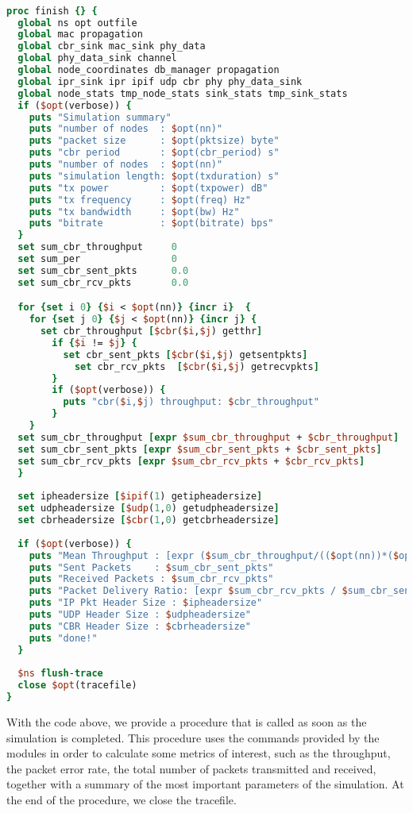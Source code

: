 \documentclass[11pt]{article}
\begin{document}
{\scriptsize\tt
\begin{lstlisting}[language=tcl]
proc finish {} {
  global ns opt outfile
  global mac propagation 
  global cbr_sink mac_sink phy_data 
  global phy_data_sink channel 
  global node_coordinates db_manager propagation
  global ipr_sink ipr ipif udp cbr phy phy_data_sink
  global node_stats tmp_node_stats sink_stats tmp_sink_stats
  if ($opt(verbose)) {
    puts "Simulation summary"
    puts "number of nodes  : $opt(nn)"
    puts "packet size      : $opt(pktsize) byte"
    puts "cbr period       : $opt(cbr_period) s"
    puts "number of nodes  : $opt(nn)"
    puts "simulation length: $opt(txduration) s"
    puts "tx power         : $opt(txpower) dB"
    puts "tx frequency     : $opt(freq) Hz"
    puts "tx bandwidth     : $opt(bw) Hz"
    puts "bitrate          : $opt(bitrate) bps"
  }
  set sum_cbr_throughput     0
  set sum_per                0
  set sum_cbr_sent_pkts      0.0
  set sum_cbr_rcv_pkts       0.0    

  for {set i 0} {$i < $opt(nn)} {incr i}  {
	for {set j 0} {$j < $opt(nn)} {incr j} {
	  set cbr_throughput [$cbr($i,$j) getthr]
		if {$i != $j} {
		  set cbr_sent_pkts [$cbr($i,$j) getsentpkts]
			set cbr_rcv_pkts  [$cbr($i,$j) getrecvpkts]
		}
		if ($opt(verbose)) {
		  puts "cbr($i,$j) throughput: $cbr_throughput"
		}
	}
  set sum_cbr_throughput [expr $sum_cbr_throughput + $cbr_throughput]
  set sum_cbr_sent_pkts [expr $sum_cbr_sent_pkts + $cbr_sent_pkts]
  set sum_cbr_rcv_pkts [expr $sum_cbr_rcv_pkts + $cbr_rcv_pkts]
  }
        
  set ipheadersize [$ipif(1) getipheadersize]
  set udpheadersize [$udp(1,0) getudpheadersize]
  set cbrheadersize [$cbr(1,0) getcbrheadersize]
    
  if ($opt(verbose)) {
    puts "Mean Throughput : [expr ($sum_cbr_throughput/(($opt(nn))*($opt(nn)-1)))]"
    puts "Sent Packets    : $sum_cbr_sent_pkts"
    puts "Received Packets : $sum_cbr_rcv_pkts"
    puts "Packet Delivery Ratio: [expr $sum_cbr_rcv_pkts / $sum_cbr_sent_pkts * 100]"
    puts "IP Pkt Header Size : $ipheadersize"
    puts "UDP Header Size : $udpheadersize"
    puts "CBR Header Size : $cbrheadersize"
    puts "done!"
  }
    
  $ns flush-trace
  close $opt(tracefile)
}
\end{lstlisting}
}

With the code above, we provide a procedure that is called as soon as the simulation is completed. This procedure uses the commands provided by the modules in order to calculate some metrics of interest, such as the throughput, the packet error rate, the total number of packets transmitted and received, together with a summary of the most important parameters of the simulation.
At the end of the procedure, we close the tracefile.\\
\end{document}
